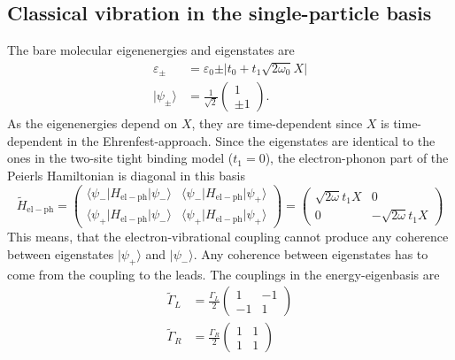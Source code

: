 \documentclass{article}
\begin{document}
\subsection{Classical vibration in the single-particle basis}
The bare molecular eigenenergies and eigenstates are
\begin{align}
	\varepsilon_\pm &= \varepsilon_0 \pm \vert t_0 +t_1\sqrt{2\omega_0}X\vert \label{eq:EW_Peierls}\\
	\vert \psi_\pm\rangle &= \frac{1}{\sqrt{2}}\begin{pmatrix}
		1\\
		\pm 1
	\end{pmatrix}.\label{eq:EV_Peierls}
\end{align}
As the eigenenergies depend on $X$, they are time-dependent since $X$ is time-dependent in the Ehrenfest-approach.
Since the eigenstates are identical to the ones in the two-site tight binding model ($t_1 = 0$), the electron-phonon part of the Peierls Hamiltonian is diagonal in this basis 
\begin{equation}
	\tilde{H}_\mathrm{el-ph} = \begin{pmatrix}
		\langle \psi_- \vert H_\mathrm{el-ph}\vert \psi_-\rangle & \langle \psi_- \vert H_\mathrm{el-ph}\vert \psi_+\rangle\\
		\langle \psi_+ \vert H_\mathrm{el-ph}\vert \psi_-\rangle & \langle \psi_+ \vert H_\mathrm{el-ph}\vert \psi_+\rangle
	\end{pmatrix}
	= \begin{pmatrix}
		\sqrt{2\omega}t_1 X & 0\\
		0 & -\sqrt{2\omega}t_1 X
	\end{pmatrix}
\end{equation}
This means, that the electron-vibrational coupling cannot produce any coherence between eigenstates $\vert \psi_+\rangle$ and $\vert \psi_-\rangle$. Any coherence between eigenstates has to come from the coupling to the leads. The couplings in the energy-eigenbasis are
\begin{align}
	\tilde{\Gamma}_L &=  \frac{\Gamma_L}{2}\begin{pmatrix}
		1 & -1 \\
		-1 & 1
	\end{pmatrix}\\
	\tilde{\Gamma}_R &=  \frac{\Gamma_R}{2}\begin{pmatrix}
		1 & 1 \\
		1 & 1
	\end{pmatrix}\\
\end{align}
\end{document}
